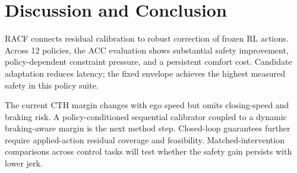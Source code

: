 \section{Discussion and Conclusion}
RACF connects residual calibration to robust correction of frozen RL actions.
Across 12 policies, the ACC evaluation shows substantial safety improvement,
policy-dependent constraint pressure, and a persistent comfort cost. Candidate
adaptation reduces latency; the fixed envelope achieves the highest measured
safety in this policy suite.

The current CTH margin changes with ego speed but omits closing-speed and
braking risk. A policy-conditioned sequential calibrator coupled to a dynamic
braking-aware margin is the next method step. Closed-loop guarantees further
require applied-action residual coverage and feasibility. Matched-intervention
comparisons across control tasks will test whether the safety gain persists
with lower jerk.
